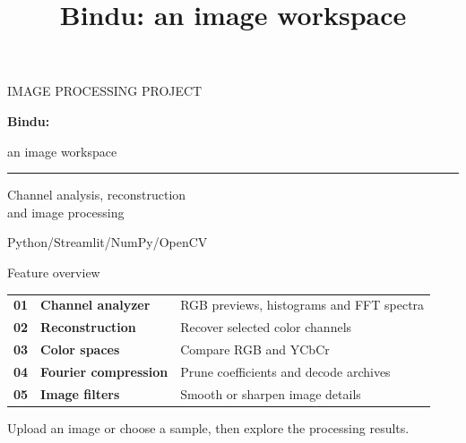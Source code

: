 \documentclass[aspectratio=169,11pt]{beamer}
\title{Bindu: an image workspace}
\newcommand{\topic}[1]{{\color{Teal}\bfseries #1}}
\newcommand{\muted}[1]{{\color{Muted}#1}}
\begin{document}
{
\begin{frame}[plain]
{\color{Mint}\small IMAGE PROCESSING PROJECT}\par\vspace{7mm}
{\fontsize{40}{44}\selectfont\bfseries Bindu:}\par\vspace{1mm}
{\fontsize{26}{30}\selectfont an image workspace}\par
\vspace{7mm}
{\color{Mint}\rule{22mm}{1.2pt}}\par\vspace{4mm}
{\large Channel analysis, reconstruction\\and image processing}\par
\vspace{7mm}
{\color{Gold}\small Python\quad /\quad Streamlit\quad /\quad NumPy\quad /\quad OpenCV}
\end{frame}
}

\begin{frame}{Feature overview}
\renewcommand{\arraystretch}{1.65}
\begin{tabular}{@{}lp{40mm}p{85mm}@{}}
\topic{01}&\textbf{Channel analyzer}&RGB previews, histograms and FFT spectra\\
\topic{02}&\textbf{Reconstruction}&Recover selected color channels\\
\topic{03}&\textbf{Color spaces}&Compare RGB and YCbCr\\
\topic{04}&\textbf{Fourier compression}&Prune coefficients and decode archives\\
\topic{05}&\textbf{Image filters}&Smooth or sharpen image details\\
\end{tabular}
\vspace{5mm}
\small\muted{Upload an image or choose a sample, then explore the processing results.}
\end{frame}
\end{document}

